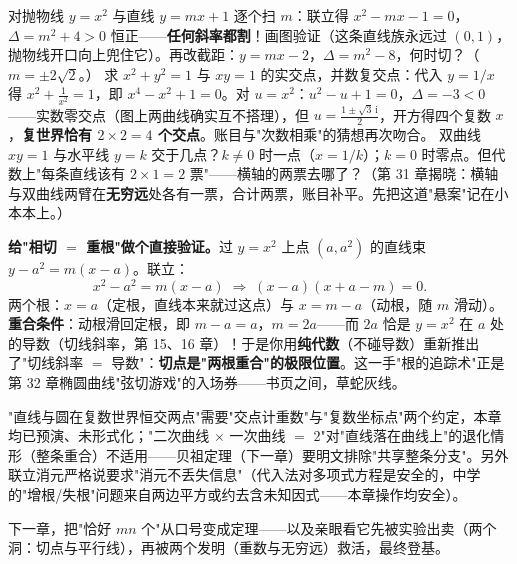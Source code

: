\begin{dongshou}
\begin{itemize}
  \yisi 对抛物线 $y = x^2$ 与直线 $y = mx + 1$ 逐个扫 $m$：联立得 $x^2 - mx - 1 = 0$，$\Delta = m^2 + 4 > 0$ 恒正——\textbf{任何斜率都割}！画图验证（这条直线族永远过 $(0,1)$，抛物线开口向上兜住它）。再改截距：$y = mx - 2$，$\Delta = m^2 - 8$，何时切？（$m = \pm2\sqrt2$。）
  \yier 求 $x^2 + y^2 = 1$ 与 $xy = 1$ 的实交点，并数复交点：代入 $y = 1/x$ 得 $x^2 + \tfrac{1}{x^2} = 1$，即 $x^4 - x^2 + 1 = 0$。对 $u = x^2$：$u^2 - u + 1 = 0$，$\Delta = -3 < 0$——实数零交点（图上两曲线确实互不搭理），但 $u = \tfrac{1\pm\sqrt3\,\mathrm{i}}2$，开方得四个复数 $x$，\textbf{复世界恰有 $2\times2 = 4$ 个交点}。账目与"次数相乘"的猜想再次吻合。
  \yier 双曲线 $xy = 1$ 与水平线 $y = k$ 交于几点？$k \ne 0$ 时一点（$x = 1/k$）；$k = 0$ 时零点。但代数上"每条直线该有 $2\times1 = 2$ 票"——横轴的两票去哪了？（第 31 章揭晓：横轴与双曲线两臂在\textbf{无穷远}处各有一票，合计两票，账目补平。先把这道"悬案"记在小本本上。）
\end{itemize}
\end{dongshou}

\begin{shaonao}
\textbf{给"相切 $=$ 重根"做个直接验证。}过 $y = x^2$ 上点 $(a, a^2)$ 的直线束 $y - a^2 = m(x - a)$。联立：
\[
x^2 - a^2 = m(x - a) \;\Longrightarrow\; (x-a)(x + a - m) = 0 .
\]
两个根：$x = a$（定根，直线本来就过这点）与 $x = m - a$（动根，随 $m$ 滑动）。\textbf{重合条件}：动根滑回定根，即 $m - a = a$，$m = 2a$——而 $2a$ 恰是 $y = x^2$ 在 $a$ 处的导数（切线斜率，第 15、16 章）！于是你用\textbf{纯代数}（不碰导数）重新推出了"切线斜率 $=$ 导数"：\textbf{切点是"两根重合"的极限位置}。这一手"根的追踪术"正是第 32 章椭圆曲线"弦切游戏"的入场券——书页之间，草蛇灰线。
\end{shaonao}

\begin{chengshi}
"直线与圆在复数世界恒交两点"需要"交点计重数"与"复数坐标点"两个约定，本章均已预演、未形式化；"二次曲线 $\times$ 一次曲线 $=$ $2$"对"直线落在曲线上"的退化情形（整条重合）不适用——贝祖定理（下一章）要明文排除"共享整条分支"。另外联立消元严格说要求"消元不丢失信息"（代入法对多项式方程是安全的，中学的"增根/失根"问题来自两边平方或约去含未知因式——本章操作均安全）。
\end{chengshi}

下一章，把"恰好 $mn$ 个"从口号变成定理——以及亲眼看它先被实验出卖（两个洞：切点与平行线），再被两个发明（重数与无穷远）救活，最终登基。
